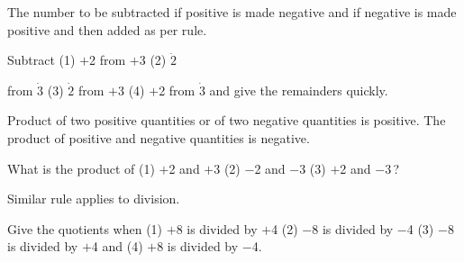 \documentclass[]{article}
\begin{document}
\begin{quote}  {
}  \end{quote}

The number to be subtracted if positive is made negative and if
negative is made positive and then added as per rule.

\begin{quote}  {
}  \end{quote}

Subtract (1) $+$2 from $+$3 (2) $\dot{2}$ {from $\dot{3}$ (3) $\dot{2}$ {from $+$3 (4) $+$2
from} $\dot{3}$ and give the remainders quickly.

\begin{quote}  {
}  \end{quote}

Product of two positive quantities or of two negative quantities is
positive. The product of positive and negative quantities is negative.

\begin{quote}  {
}  \end{quote}

What is the product of (1) $+$2 and $+$3 (2) $-$2 and $-$3 (3) $+$2 and $-$3\,?

\begin{quote}  {
}  \end{quote}

Similar rule applies to division.

\begin{quote}  {
}  \end{quote}
\newpage
\large

Give the quotients when (1) $+$8 is divided by $+$4 (2) $-$8 is divided by
$-$4 (3) $-$8 is divided by $+$4 and (4) $+$8 is divided by $-$4.

\begin{quote}  {
}  \end{quote}

}
\end{document}
